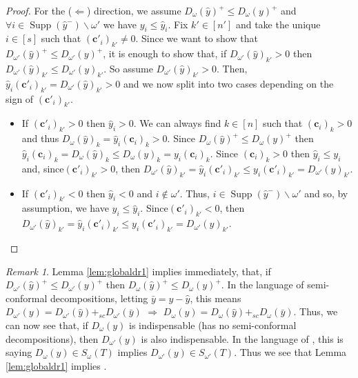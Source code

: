 \documentclass[a4paper, 12pt]{article}
\theoremstyle{plain}
\theoremstyle{definition}
\theoremstyle{remark}
\newtheorem{remark}[theorem]{Remark}
\begin{document}
\begin{proof}
For the ($\Leftarrow$) direction, we assume $D_{\omega}(\hat y)^+ \le D_{\omega}(y)^+$ and $\forall i \in \operatorname{Supp}(\hat y^-) \backslash \omega'$ we have $y_i \le \hat y_i$.  Fix $k' \in [n']$ and take the unique $i \in [s]$ such that $(\mathbf{c}'_i)_{k'} \neq 0$. Since we want to show that $D_{\omega'}(\hat y)^+ \le D_{\omega'}(y)^+$, it is enough to show that, if $D_{\omega'}(\hat y)_{k'}>0$ then $D_{\omega'}(\hat y)_{k'} \le D_{\omega'}(y)_{k'}$. So assume $D_{\omega'}(\hat y)_{k'}>0$. Then, $\hat y_i(\mathbf{c}'_i)_{k'}=D_{\omega'}(\hat y)_{k'}>0$ and we now split into two cases depending on the sign of $(\mathbf{c}'_i)_{k'}$.
    \begin{itemize}
        \item If $(\mathbf{c}'_i)_{k'}>0$ then $\hat y_i>0$. We can always find $k \in [n]$ such that $(\mathbf{c}_i)_{k}>0$ and thus $D_{\omega}(\hat y)_{k}=\hat y_i ( \mathbf{c}_i)_{k}>0$. Since $D_{\omega}(\hat y)^+ \le D_{\omega}(y)^+$ then $\hat y_i(\mathbf{c}_i)_{k}=D_{\omega}(\hat y)_{k} \le D_{\omega}(y)_{k}=y_i (\mathbf{c}_i)_{k}$. Since $(\mathbf{c}_i)_{k}>0$ then $\hat y_i \le y_i$ and, since$(\mathbf{c}'_i)_{k'}>0$, then $D_{\omega'}(\hat y)_{k'}=\hat y_i (\mathbf{c}'_i)_{k'} \le y_i (\mathbf{c}'_i)_{k'}= D_{\omega'}(y)_{k'}$.
        \item If $(\mathbf{c}'_i)_{k'}<0$ then $\hat y_i<0$ and $i \not \in \omega'$. Thus, $i \in \operatorname{Supp}(\hat y^-) \backslash \omega'$ and so, by assumption, we have $y_i \le \hat y_i$. Since$(\mathbf{c}'_i)_{k'}<0$, then $D_{\omega'}(\hat y)_{k'}=\hat y_i (\mathbf{c}'_i)_{k'} \le y_i (\mathbf{c}'_i)_{k'}= D_{\omega'}(y)_{k'}$.
    \end{itemize}
\end{proof}

\begin{remark}
    Lemma \ref{lem:globaldr1} implies immediately, that, if $D_{\omega'}(\hat y)^+ \le D_{\omega'}(y)^+$ then $D_{\omega}(\hat y)^+ \le D_{\omega}(y)^+$. In the language of semi-conformal decompositions, letting $\bar y=y-\hat y$, this means $D_{\omega'}(y)=D_{\omega'}(\hat y)+_{sc}D_{\omega'}(\bar y)$ $\Rightarrow$ $D_{\omega}(y)=D_{\omega}(\hat y)+_{sc}D_{\omega}(\bar y)$. Thus, we can now see that, if $D_{\omega}(y)$ is indispensable (has no semi-conformal decompositions), then $D_{\omega'}(y)$ is also indispensable. In the language of \cite[Section 3]{kosta2023strongly}, this is saying $D_{\omega}(y) \in S_{\omega}(T)$ implies $D_{\omega'}(y) \in S_{\omega'}(T)$. Thus we see that Lemma \ref{lem:globaldr1} implies \cite[Proposition 3.3]{kosta2023strongly}.
\end{remark}
\end{document}
